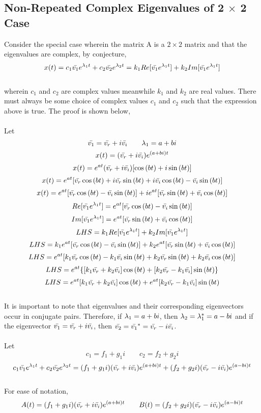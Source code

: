 \documentclass[a4paper, 12pt]{report}
\begin{document}
\begin{center}
\section{Non-Repeated Complex Eigenvalues of 2 $\times$ 2 Case}
\begin{comment}
\end{comment}
Consider the special case wherein the matrix A is a $2\times2$ matrix and that the eigenvalues are complex, by conjecture,
$$x(t) = c_1\bar{v_1}e^{\lambda_1 t} + c_2\bar{v_2}e^{\lambda_2 t} = k_1Re[\bar{v_1}e^{\lambda_1 t}] + k_2Im[\bar{v_1}e^{\lambda_1 t}]$$
\\wherein $c_1$ and $c_2$ are complex values meanwhile $k_1$ and $k_2$ are real values. There must always be some choice of complex values $c_1$ and $c_2$ such that the expression above is true. The proof is shown below,
\\~\\Let 
$$\bar{v_1} = \bar{v_r} + i\bar{v_i}\qquad \lambda_1 = a + bi$$
$$x(t) = (\bar{v_r} + i\bar{v_i})e^{(a+bi)t}$$
$$x(t) = e^{at}(\bar{v_r} + i\bar{v_i})[\cos{(bt)} + i\sin{(bt)}]$$
$$x(t) = e^{at}[\bar{v_r}\cos{(bt)} + i\bar{v_r}\sin{(bt)} + i\bar{v_i}\cos{(bt)} - \bar{v_i}\sin{(bt)}]$$
$$x(t) = e^{at}[\bar{v_r}\cos{(bt)} - \bar{v_i}\sin{(bt)}]+ ie^{at}[\bar{v_r}\sin{(bt)} + \bar{v_i}\cos{(bt)}]$$
$$Re[\bar{v_1}e^{\lambda_1 t}] = e^{at}[\bar{v_r}\cos{(bt)} - \bar{v_i}\sin{(bt)}]$$
$$Im[\bar{v_1}e^{\lambda_1 t}] = e^{at}[\bar{v_r}\sin{(bt)} + \bar{v_i}\cos{(bt)}]$$
$$LHS = k_1Re[\bar{v_1}e^{\lambda_1 t}] + k_2Im[\bar{v_1}e^{\lambda_1 t}]$$
$$LHS = k_1e^{at}[\bar{v_r}\cos{(bt)} - \bar{v_i}\sin{(bt)}] + k_2e^{at}[\bar{v_r}\sin{(bt)} + \bar{v_i}\cos{(bt)}]$$
$$LHS = e^{at}[k_1\bar{v_r}\cos{(bt)} - k_1\bar{v_i}\sin{(bt)} + k_2\bar{v_r}\sin{(bt)} + k_2\bar{v_i}\cos{(bt)}]$$
$$LHS = e^{at}\{[k_1\bar{v_r}+ k_2\bar{v_i}]\cos{(bt)}  + [k_2\bar{v_r}- k_1\bar{v_i}]\sin{(bt)}\}$$
$$LHS = e^{at}[k_1\bar{v_r}+ k_2\bar{v_i}]\cos{(bt)}  + e^{at}[k_2\bar{v_r}- k_1\bar{v_i}]\sin{(bt)}$$
\\It is important to note that eigenvalues and their corresponding eigenvectors occur in conjugate pairs. Therefore, if $\lambda_1 = a+bi$, then $\lambda_2 = \lambda_1^\ast = a - bi$ and if the eigenvector $\bar{v_1} = \bar{v_r} + i\bar{v_i}$, then $\bar{v_2} =\bar{v_1}^\ast= \bar{v_r} - i\bar{v_i}$.
\\~\\Let
$$c_1 = f_1 + g_1i\qquad c_2 = f_2 + g_2i$$
$$c_1\bar{v_1}e^{\lambda_1 t} + c_2\bar{v_2}e^{\lambda_2 t} = (f_1 + g_1i)(\bar{v_r} + i\bar{v_i})e^{(a+bi)t} + (f_2 + g_2i)(\bar{v_r} - i\bar{v_i})e^{(a-bi)t}$$
\\For ease of notation,
$$A(t) = (f_1 + g_1i)(\bar{v_r} + i\bar{v_i})e^{(a+bi)t}\qquad B(t) = (f_2 + g_2i)(\bar{v_r} - i\bar{v_i})e^{(a-bi)t}$$

\end{center}
\end{document}

